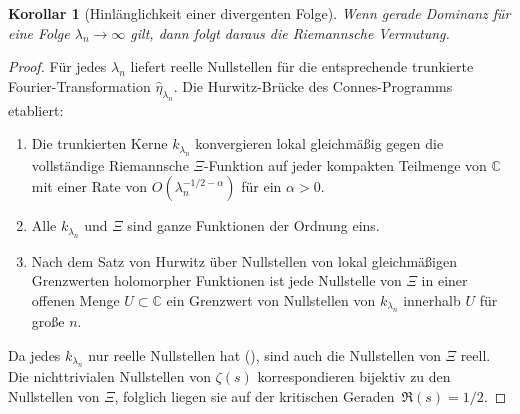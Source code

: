 \documentclass[11pt,a4paper]{article}
\newtheorem{corollary}[corollary]{Korollar}
\theoremstyle{remark}
\theoremstyle{plain}
\begin{document}
\begin{corollary}[Hinlänglichkeit einer divergenten Folge]
\label{cor:sequence-suffices}
Wenn gerade Dominanz für eine Folge $\lambda_n\to\infty$ gilt, dann folgt daraus die Riemannsche Vermutung.
\end{corollary}

\begin{proof}
Für jedes $\lambda_n$ liefert  reelle Nullstellen für die entsprechende trunkierte Fourier-Transformation $\widehat\eta_{\lambda_n}$. Die Hurwitz-Brücke des Connes-Programms~\cite[Fact~6.4 und Abschnitte~6.4--6.6]{Connes2026} etabliert:
\begin{enumerate}[label=(\alph*),leftmargin=*]
  \item Die trunkierten Kerne $k_{\lambda_n}$ konvergieren lokal gleichmäßig gegen die vollständige Riemannsche $\Xi$-Funktion auf jeder kompakten Teilmenge von $\mathbb{C}$ mit einer Rate von $O(\lambda_n^{-1/2-\alpha})$ für ein $\alpha>0$.
  \item Alle $k_{\lambda_n}$ und $\Xi$ sind ganze Funktionen der Ordnung eins.
  \item Nach dem Satz von Hurwitz über Nullstellen von lokal gleichmäßigen Grenzwerten holomorpher Funktionen ist jede Nullstelle von $\Xi$ in einer offenen Menge $U\subset\mathbb{C}$ ein Grenzwert von Nullstellen von $k_{\lambda_n}$ innerhalb $U$ für große $n$.
\end{enumerate}
Da jedes $k_{\lambda_n}$ nur reelle Nullstellen hat (), sind auch die Nullstellen von $\Xi$ reell. Die nichttrivialen Nullstellen von $\zeta(s)$ korrespondieren bijektiv zu den Nullstellen von $\Xi$, folglich liegen sie auf der kritischen Geraden~$\Re(s)=1/2$.
\end{proof}
\end{document}
